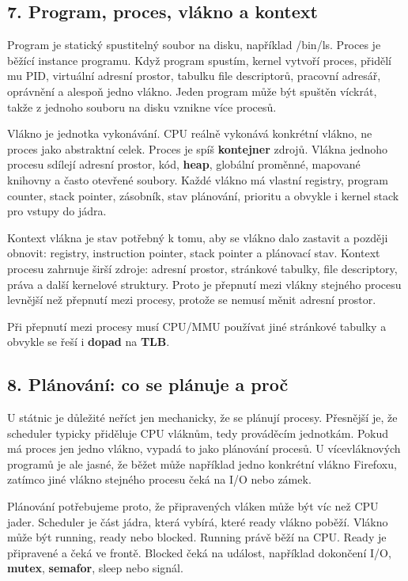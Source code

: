 \subsection*{7. Program, proces, vlákno a kontext}

Program je statický spustitelný soubor na disku, například /bin/ls. Proces je běžící instance programu. Když program spustím, kernel vytvoří proces, přidělí mu PID, virtuální adresní prostor, tabulku file descriptorů, pracovní adresář, oprávnění a alespoň jedno vlákno. Jeden program může být spuštěn víckrát, takže z jednoho souboru na disku vznikne více procesů.

Vlákno je jednotka vykonávání. CPU reálně vykonává konkrétní vlákno, ne proces jako abstraktní celek. Proces je spíš \textbf{kontejner} zdrojů. Vlákna jednoho procesu sdílejí adresní prostor, kód, \textbf{heap}, globální proměnné, mapované knihovny a často otevřené soubory. Každé vlákno má vlastní registry, program counter, stack pointer, zásobník, stav plánování, prioritu a obvykle i kernel stack pro vstupy do jádra.

Kontext vlákna je stav potřebný k tomu, aby se vlákno dalo zastavit a později obnovit: registry, instruction pointer, stack pointer a plánovací stav. Kontext procesu zahrnuje širší zdroje: adresní prostor, stránkové tabulky, file descriptory, práva a další kernelové struktury. Proto je přepnutí mezi vlákny stejného procesu levnější než přepnutí mezi procesy, protože se nemusí měnit adresní prostor.

Při přepnutí mezi procesy musí CPU/MMU používat jiné stránkové tabulky a obvykle se řeší i \textbf{dopad} na \textbf{TLB}.

\subsection*{8. Plánování: co se plánuje a proč}

U státnic je důležité neříct jen mechanicky, že se plánují procesy. Přesnější je, že scheduler typicky přiděluje CPU vláknům, tedy prováděcím jednotkám. Pokud má proces jen jedno vlákno, vypadá to jako plánování procesů. U vícevláknových programů je ale jasné, že běžet může například jedno konkrétní vlákno Firefoxu, zatímco jiné vlákno stejného procesu čeká na I/O nebo zámek.

Plánování potřebujeme proto, že připravených vláken může být víc než CPU jader. Scheduler je část jádra, která vybírá, které ready vlákno poběží. Vlákno může být running, ready nebo blocked. Running právě běží na CPU. Ready je připravené a čeká ve frontě. Blocked čeká na událost, například dokončení I/O, \textbf{mutex}, \textbf{semafor}, sleep nebo signál.

